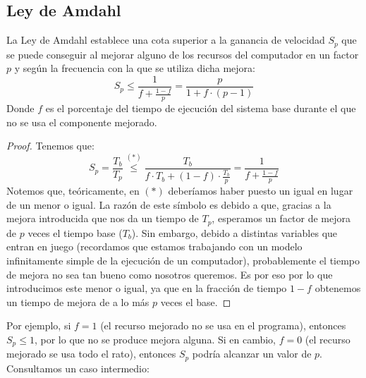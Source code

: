 \subsection{Ley de Amdahl} \label{sec:amdahl}
La Ley de Amdahl establece una cota superior a la ganancia de velocidad $S_p$ que se puede conseguir al mejorar alguno de los recursos del computador en un factor $p$ y según la frecuencia con la que se utiliza dicha mejora:
\begin{equation}
    S_p \leq \frac{1}{f+\frac{1-f}{p}} =  \dfrac{p}{1+f\cdot (p-1)}
\end{equation}
Donde $f$ es el porcentaje del tiempo de ejecución del sistema base durante el que no se usa el componente mejorado.
\begin{proof}
    Tenemos que:
    \begin{equation*}
        S_p = \dfrac{T_b}{T_p} \stackrel{(\ast)}{\leq} \dfrac{T_b}{f\cdot T_b + (1-f)\cdot \frac{T_b}{p}} = \dfrac{1}{f + \frac{1-f}{p}}
    \end{equation*}
    Notemos que, teóricamente, en $(\ast)$ deberíamos haber puesto un igual en lugar de un menor o igual. La razón de este símbolo es debido a que, gracias a la mejora introducida que nos da un tiempo de $T_p$, esperamos un factor de mejora de $p$ veces el tiempo base ($T_b$). Sin embargo, debido a distintas variables que entran en juego (recordamos que estamos trabajando con un modelo infinitamente simple de la ejecución de un computador), probablemente el tiempo de mejora no sea tan bueno como nosotros queremos. Es por eso por lo que introducimos este menor o igual, ya que en la fracción de tiempo $1-f$ obtenemos un tiempo de mejora de a lo más $p$ veces el base.
\end{proof}


Por ejemplo, si $f = 1$ (el recurso mejorado no se usa en el programa), entonces $S_p \leq 1$, por lo que no se produce mejora alguna. Si en cambio, $f = 0$ (el recurso mejorado se usa todo el rato), entonces $S_p$ podría alcanzar un valor de $p$. Consultamos un caso intermedio:

